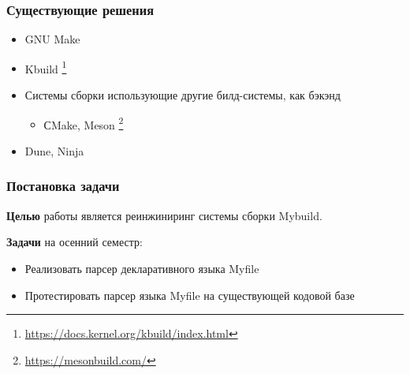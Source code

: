 \documentclass{beamer}
\begin{document}
\begin{frame}
	\frametitle{Существующие решения}
	\begin{itemize}
		\item GNU Make
		\item Kbuild \footnote{\href{https://docs.kernel.org/kbuild/index.html}{https://docs.kernel.org/kbuild/index.html}}
		\item Системы сборки использующие другие билд-системы, как бэкэнд \begin{itemize}
			      \item СMake, Meson \footnote{\href{https://mesonbuild.com/}{https://mesonbuild.com/}}
		      \end{itemize}
		\item Dune, Ninja
	\end{itemize}

\end{frame}


\begin{frame}
	\frametitle{Постановка задачи}
	\textbf{Целью} работы является реинжиниринг системы сборки Mybuild.

	\textbf{Задачи} на осенний семестр:
	\begin{itemize}
		\item Реализовать парсер декларативного языка Myfile %
		\item Протестировать парсер языка Myfile на существующей кодовой базе
	\end{itemize}
\end{frame}
\end{document}
